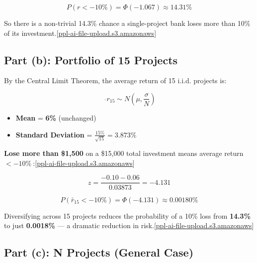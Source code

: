 \documentclass[a4paper]{article}
\begin{document}
\[P(r < - 10\%) = \Phi( - 1.067) \approx \mathbf{14.31\%}\]

So there is a non-trivial 14.3\% chance a single-project bank loses more
than 10\% of its
investment.{[}\href{https://ppl-ai-file-upload.s3.amazonaws.com/web/direct-files/attachments/64012734/8ecdf432-f8fa-409d-b72d-017134eed977/Homework1.pdf}{ppl-ai-file-upload.s3.amazonaws}{]}\hspace{0pt}

\hypertarget{part-b-portfolio-of-15-projects}{%
\subsection{Part (b): Portfolio of 15
Projects}\label{part-b-portfolio-of-15-projects}}

By the Central Limit Theorem, the average return of 15 i.i.d. projects
is:

\[\ \overline{}r_{15} \sim N\left( \mu,\frac{\sigma}{N} \right)\]

\begin{itemize}
\item
  \textbf{Mean} = \textbf{6\%} (unchanged)
\item
  \textbf{Standard Deviation} =
  \(\frac{15\%}{\sqrt{15}} = \mathbf{3.873\%}\)
\end{itemize}

\textbf{Lose more than \$1,500} on a \$15,000 total investment means
average return
\(\left. <-10\% \right.\ \):{[}\href{https://ppl-ai-file-upload.s3.amazonaws.com/web/direct-files/attachments/64012734/8ecdf432-f8fa-409d-b72d-017134eed977/Homework1.pdf}{ppl-ai-file-upload.s3.amazonaws}{]}\hspace{0pt}

\[z = \frac{- 0.10 - 0.06}{0.03873} = - 4.131\]

\[P({\overset{ˉ}{r}}_{15} < - 10\%) = \Phi( - 4.131) \approx \mathbf{0.00180\%}\]

Diversifying across 15 projects reduces the probability of a 10\% loss
from \textbf{14.3\%} to just \textbf{0.0018\%} --- a dramatic reduction
in
risk.{[}\href{https://ppl-ai-file-upload.s3.amazonaws.com/web/direct-files/attachments/64012734/8ecdf432-f8fa-409d-b72d-017134eed977/Homework1.pdf}{ppl-ai-file-upload.s3.amazonaws}{]}\hspace{0pt}

\hypertarget{part-c-n-projects-general-case}{%
\subsection{Part (c): N Projects (General
Case)}\label{part-c-n-projects-general-case}}
\end{document}
